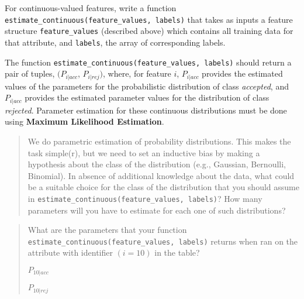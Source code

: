 \begin{enumerate}
    For continuous-valued features, write a function \texttt{estimate\_continuous(feature\_values, labels)} that takes as inputs a feature structure \texttt{feature\_values} (described above) which contains all training data for that attribute, and \texttt{labels}, the array of corresponding labels. 
    
    The function \texttt{estimate\_continuous(feature\_values, labels)} should return a pair of tuples, $(P_{i|acc}$, $P_{i|rej})$, where, for feature $i$, $P_{i|acc}$ provides the estimated values of the parameters for the probabilistic distribution of class {\em accepted}, and $P_{i|acc}$ provides the estimated parameter values for the distribution of class {\em rejected}. Parameter estimation for these continuous distributions must be done using \textbf{Maximum Likelihood Estimation}.
    
    \begin{quote}
      We do parametric estimation of probability distributions. This makes the task simple(r), but we need to set an inductive bias by making a hypothesis about the class of the distribution (e.g., Gaussian, Bernoulli, Binomial). In absence of additional knowledge about the data, what could be a suitable choice for the class of the distribution that you should assume in \texttt{estimate\_continuous(feature\_values, labels)}? How many parameters will you have to estimate for each one of such distributions?
    
    \begin{tcolorbox}[fit,height=4cm, width=0.8\textwidth, blank,     borderline={1pt}{-2pt},nobeforeafter]
    \end{tcolorbox}
    \end{quote}
    
    \pagebreak
    \begin{quote}
     What are the parameters that your function\\ \texttt{estimate\_continuous(feature\_values, labels)} returns when ran on the attribute with identifier $(i = 10)$ in the table?
    
    $P_{10|acc}$  \begin{tcolorbox}[fit,height=1cm, width=4cm, blank, borderline={1pt}{-2pt},nobeforeafter]
    \begin{center} \end{center}
    \end{tcolorbox}\hspace{2cm}
    
    $P_{10|rej}$
    \begin{tcolorbox}[fit,height=1cm, width=4cm, blank, borderline={1pt}{-2pt},nobeforeafter]
    \begin{center} \end{center}
    \end{tcolorbox}\hspace{2cm}
    \end{quote}


\end{enumerate}
